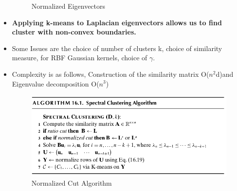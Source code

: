 \begin{itemize}
\begin{figure}[H]
        \caption{\label{fig:figure9}Normalized Eigenvectors}
    \end{figure}
    \item \textbf{Applying k-means to Laplacian eigenvectors allows us to find cluster with non-convex boundaries.}
    \item Some Issues are the choice of number of clusters k, choice of similarity measure, for RBF Gaussian kernels, choice of $\gamma$.
    \item Complexity is as follows, Construction of the similarity matrix O($n^2$d)and Eigenvalue decomposition O($n^3$)
    \begin{figure}[H]
        \centerline{\includegraphics[width=\textwidth]{Figures/spectral.png}}
        \caption{\label{fig:figure10}Normalized Cut Algorithm}
    \end{figure}
\end{itemize}